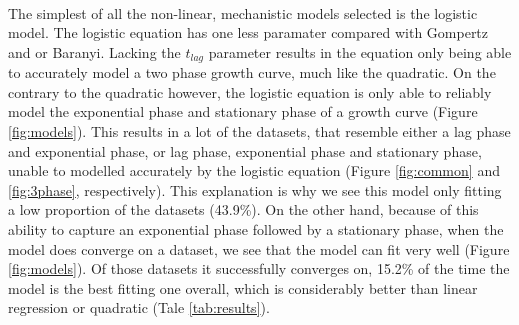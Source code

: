 \documentclass[11pt, a4paper]{article} %
\begin{document}
\paragraph{} The simplest of all the non-linear, mechanistic models selected is the logistic model. The logistic equation has one less paramater compared with Gompertz and or Baranyi. Lacking the $t_{lag}$ parameter results in the equation only being able to accurately model a two phase growth curve, much like the quadratic. On the contrary to the quadratic however, the logistic equation is only able to reliably model the exponential phase and stationary phase of a growth curve (Figure \ref{fig:models}). This results in a lot of the datasets, that resemble either a lag phase and exponential phase, or lag phase, exponential phase and stationary phase, unable to modelled accurately by the logistic equation (Figure \ref{fig:common} and \ref{fig:3phase}, respectively). This explanation is why we see this model only fitting a low proportion of the datasets (43.9\%). On the other hand, because of this ability to capture an exponential phase followed by a stationary phase, when the model does converge on a dataset, we see that the model can fit very well (Figure \ref{fig:models}). Of those datasets it successfully converges on, 15.2\% of the time the model is the best fitting one overall, which is considerably better than linear regression or quadratic (Tale \ref{tab:results}).
\end{document}
